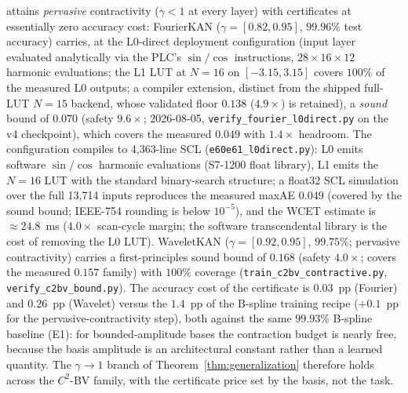 attains \emph{pervasive} contractivity ($\gamma < 1$ at every layer)
with certificates at essentially zero accuracy cost: FourierKAN
($\gamma = [0.82, 0.95]$, $99.96\%$ test accuracy) carries, at the
L0-direct deployment configuration (input layer evaluated analytically
via the PLC's $\sin/\cos$ instructions, $28\times16\times12$ harmonic
evaluations; the L1 LUT at $N{=}16$ on $[-3.15, 3.15]$ covers $100\%$
of the measured L0 outputs; a compiler extension, distinct from the
shipped full-LUT $N{=}15$ backend, whose validated floor $0.138$
($4.9\times$) is retained), a \emph{sound} bound of $0.070$ (safety
$9.6\times$; 2026-08-05, \texttt{verify\_fourier\_l0direct.py} on the
v4 checkpoint), which covers the measured $0.049$ with $1.4\times$
headroom. The configuration compiles to 4{,}363-line SCL
(\texttt{e60e61\_l0direct.py}): L0 emits software $\sin/\cos$ harmonic
evaluations (S7-1200 float library), L1 emits the $N{=}16$ LUT with the
standard binary-search structure; a float32 SCL simulation over the
full 13{,}714 inputs reproduces the measured maxAE $0.049$ (covered by
the sound bound; IEEE-754 rounding is below $10^{-5}$), and the WCET
estimate is $\approx 24.8$~ms ($4.0\times$ scan-cycle margin; the
software transcendental library is the cost of removing the L0 LUT). WaveletKAN ($\gamma = [0.92, 0.95]$, $99.75\%$; pervasive
contractivity) carries a first-principles sound bound of $0.168$ (safety
$4.0\times$; covers the measured $0.157$ family) with $100\%$ coverage
(\texttt{train\_c2bv\_contractive.py},
\texttt{verify\_c2bv\_bound.py}). The accuracy cost of the certificate
is $0.03$~pp (Fourier) and $0.26$~pp (Wavelet) versus the $1.4$~pp of
the B-spline training recipe ($+0.1$~pp for the pervasive-contractivity
step), both against the same $99.93\%$ B-spline baseline
(E1): for bounded-amplitude bases the contraction budget
is nearly free, because the basis amplitude is an architectural constant
rather than a learned quantity. The $\gamma \to 1$ branch of
Theorem~\ref{thm:generalization} therefore holds across the $C^2$-BV
family, with the certificate price set by the basis, not the task.

